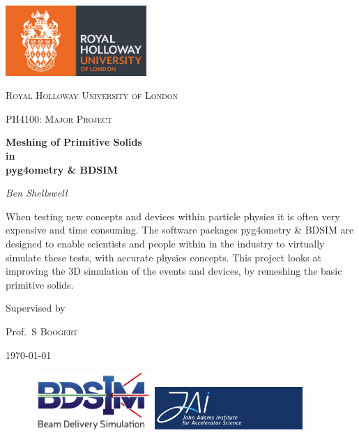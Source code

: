 \documentclass[12pt,a4paper]{article}
\begin{document}
\begin{titlepage}
	\centering
	\includegraphics[width=0.4\textwidth]{Images//Logos//rhul.jpg}\par\vspace{1cm}


	{\scshape\LARGE Royal Holloway University of London \par}
	\vspace{1cm}
	{\scshape\Large PH4100: Major Project\par}
	\vspace{1.5cm}
	{\huge\bfseries Meshing of Primitive Solids\\
	in\\
	pyg4ometry \& BDSIM\par}
	\vspace{2cm}
	{\Large\itshape Ben Shellswell\par}
	\vfill

\begin{abstract}
\centering

\end{abstract}
When testing new concepts and devices within particle physics it is often very expensive and time consuming. The software packages pyg4ometry \& BDSIM are designed to enable scientists and people within in the industry to virtually simulate these tests, with accurate physics concepts. This project looks at improving the 3D simulation of the events and devices, by remeshing the basic primitive solids.

	\vfill
	
	Supervised by\par
	Prof.~S \textsc{Boogert} 

	{\large \today\par}



\begin{figure}[h]
\centering
\begin{minipage}{.6\textwidth}
  \includegraphics[width=0.4\textwidth]{Images//Logos//BDSIM_Logo.jpg}
\end{minipage}%
\begin{minipage}{.6\textwidth}
  \centering
  \includegraphics[width=0.5\textwidth]{Images//Logos//JAI_Logo.jpeg}
  \end{minipage}
\end{figure}


\end{titlepage}
\end{document}
